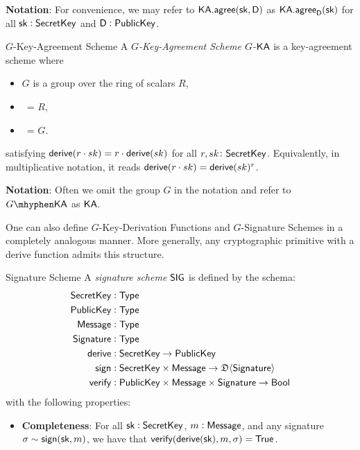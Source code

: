     \textbf{Notation}: For convenience, we may refer to ${\textsf{KA}}.{\textsf{agree}}({\textsf{sk}}, \textsf{D})$ as ${\textsf{KA}}.{\textsf{agree}}_{\textsf{D}}({\textsf{sk}})$ for all ${\textsf{sk}} : {\textsf{SecretKey}}$ and $\textsf{D} : {\textsf{PublicKey}}$.

    \begin{definitiontoc}{$G$-Key-Agreement Scheme}
        A \emph{$G$-Key-Agreement Scheme $G$-${\textsf{KA}}$} is a key-agreement scheme where
        \begin{itemize}
            \item $G$ is a group over the ring of scalars $R$,
            \item \SecretKey \ = $R$,
            \item \PublicKey \ = $G$.
        \end{itemize}
        satisfying ${\textsf{derive}}(r \cdot sk) = r \cdot {\textsf{derive}} (sk)$ for all $r, sk \colon {\textsf{SecretKey}}$. Equivalently, in multiplicative notation, it reads ${\textsf{derive}}(r \cdot sk) = {\textsf{derive}} (sk)^r$.
    \end{definitiontoc}

    \textbf{Notation}: Often we omit the group $G$ in the notation and refer to $G\mhyphen\KA$ as ${\textsf{KA}}$.
    \begin{remark*}
        One can also define $G$-Key-Derivation Functions and $G$-Signature Schemes in a completely analogous manner. More generally, any cryptographic primitive with a derive function admits this structure. 
    \end{remark*}

\begin{definitiontoc}{Signature Scheme}
    A \emph{signature scheme} ${\textsf{SIG}}$ is defined by the schema:
    \begin{align*}
        {\textsf{SecretKey}}    &: {\textsf{Type}} \\
        {\textsf{PublicKey}}    &: {\textsf{Type}} \\
        {\textsf{Message}}      &: {\textsf{Type}} \\
        {\textsf{Signature}}    &: {\textsf{Type}} \\
        {\textsf{derive}}       &: {\textsf{SecretKey}} \to {\textsf{PublicKey}} \\
        {\textsf{sign}}         &: {\textsf{SecretKey}} \times {\textsf{Message}} \to \mathfrak{D}\langle{{\textsf{Signature}}}\rangle \\
        {\textsf{verify}}       &: {\textsf{PublicKey}} \times {\textsf{Message}} \times {\textsf{Signature}} \to {\textsf{Bool}}
    \end{align*}
    with the following properties:
    \begin{itemize}
        \item \textbf{Completeness}: For all ${\textsf{sk}} : {\textsf{SecretKey}}$, $m : {\textsf{Message}}$, and any signature $\sigma \sim {\textsf{sign}}({\textsf{sk}}, m)$, we have that ${\textsf{verify}}({\textsf{derive}}({\textsf{sk}}), m, \sigma) = {\textsf{True}}$.
    \end{itemize}
\end{definitiontoc}




